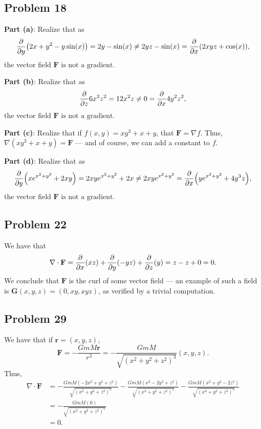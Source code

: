 \documentclass[11pt]{article}
\renewcommand{\vec}[1]{\mathbf{#1}}
\renewcommand{\div}{\nabla \cdot}
\renewcommand{\grad}{\nabla}
\begin{document}

\subsection*{Problem 18}

\textbf{Part (a)}: Realize that as
\[
	\pdv{y} (2x + y^{2} - y \sin(x)) = 2y - \sin(x) \ne 2yz - \sin(x) = \pdv{x} (2xyz + \cos(x)),
\]
the vector field $\boxed{\text{$\mathbf{F}$ is not a gradient}}$.

\textbf{Part (b)}: Realize that as
\[
	\pdv{z} 6x^{2}z^{2} = 12x^{2}z \ne 0 = \pdv{x} 4y^{2}z^{2},
\]
the vector field $\boxed{\text{$\mathbf{F}$ is not a gradient}}$.

\textbf{Part (c)}: Realize that if $f(x, y) = xy^{3} + x + y$, that $\mathbf{F} = \grad f$. Thus, $\boxed{\grad (xy^{3} + x + y) = \mathbf{F}}$ --- and of course, we can add a constant to $f$.

\textbf{Part (d)}: Realize that as
\[
	\pdv{y} (x e^{x^{2} + y^{2}} + 2xy) = 2xy e^{x^{2} + y^{2}} + 2x \ne 2xy e^{x^{2} + y^{2}} = \pdv{x} (y e^{x^{2} + y^{2}} + 4y^{3}z),
\]
the vector field $\boxed{\text{$\mathbf{F}$ is not a gradient}}$.


\subsection*{Problem 22}

We have that
\[
	\div \mathbf{F} = \pdv{x} (xz) + \pdv{y} (-yz) + \pdv{z} (y) = z - z + 0 = 0.
\]
We conclude that $\mathbf{F}$ is the curl of some vector field --- an example of such a field is $\boxed{\mathbf{G}(x, y, z) = (0, xy, xyz)}$, as verified by a trivial computation.


\subsection*{Problem 29}

We have that if $\vec{r} = (x, y, z)$,
\[
	\mathbf{F} = -\frac{GmM \vec{r}}{r^{3}} = -\frac{GmM}{\sqrt{(x^{2}+y^{2}+z^{2})^{3}}} (x, y, z).
\]
Thus,
\begin{align*}
	\div \mathbf{F} &= -\frac{GmM(-2x^{2} + y^{2} + z^{2})}{\sqrt{(x^{2} + y^{2} + z^{2})^{5}}}  -\frac{GmM(x^{2} - 2y^{2} + z^{2})}{\sqrt{(x^{2} + y^{2} + z^{2})^{5}}} -\frac{GmM(x^{2} + y^{2} - 2z^{2})}{\sqrt{(x^{2} + y^{2} + z^{2})^{5}}} \\
					&= - \frac{GmM(0)}{\sqrt{(x^{2} + y^{2} + z^{2})^{5}}} \\
					&= 0.
\end{align*}
\end{document}
